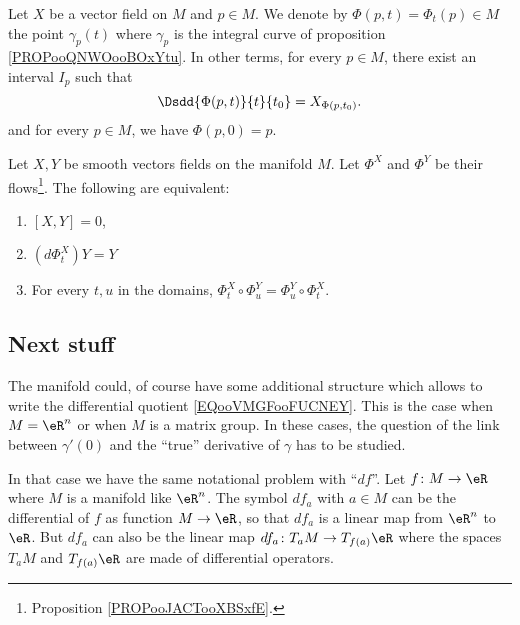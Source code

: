 Let \( X\) be a vector field on \( M\) and \( p\in M\). We denote by \( \Phi(p,t)=\Phi_t(p)\in M\) the point \( \gamma_p(t)\) where \( \gamma_p\) is the integral curve of proposition \ref{PROPooQNWOooBOxYtu}. In other terms, for every \( p\in M\), there exist an interval \( I_p\) such that
\begin{equation}
	\Dsdd{ \Phi(p,t) }{t}{t_0}=X_{\Phi(p,t_0)}.
\end{equation}
and for every \( p\in M\), we have \( \Phi(p,0)=p\).


\begin{proposition}       \label{PROPooDPXIooTvXOIP}
	Let \( X,Y\) be smooth vectors fields on the manifold \( M\). Let \( \Phi^X\) and \( \Phi^Y\) be their flows\footnote{Proposition \ref{PROPooJACTooXBSxfE}.}. The following are equivalent:
	\begin{enumerate}
		\item
		      \( [X,Y]=0\),
		\item
		      \( (d\Phi_t^X)Y=Y\)
		\item
		      For every \( t,u\) in the domains, \( \Phi_t^X\circ\Phi_u^Y=\Phi^Y_u\circ\Phi^X_t\).
	\end{enumerate}
\end{proposition}

\subsection{Next stuff}

The manifold could, of course have some additional structure which allows to write the differential quotient \eqref{EQooVMGFooFUCNEY}. This is the case when \( M=\eR^n\) or when \( M\) is a matrix group. In these cases, the question of the link between \( \gamma'(0)\) and the ``true'' derivative of \( \gamma\) has to be studied.

In that case we have the same notational problem with ``$df$''. Let \( f\colon M\to \eR\) where \( M\) is a manifold like \( \eR^n\). The symbol \( df_a\) with \( a\in M\) can be the differential of \( f\) as function \( M\to \eR\), so that \( df_a\) is a linear map from \( \eR^n\) to \( \eR\). But \( df_a\) can also be the linear map \( df_a\colon T_aM\to T_{f(a)}\eR\) where the spaces \( T_aM\) and \( T_{f(a)}\eR\) are made of differential operators.

